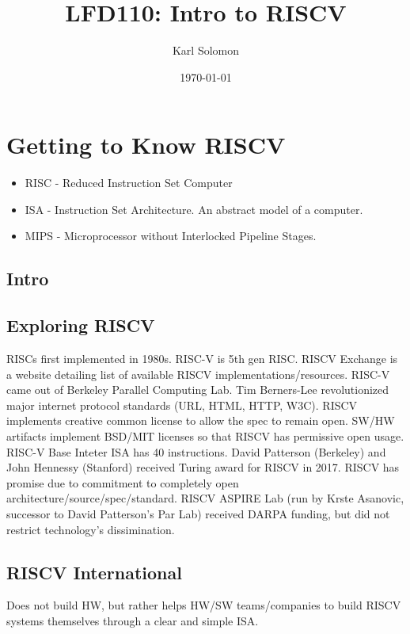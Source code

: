 \documentclass[10pt,a4paper]{article}
\title{LFD110: Intro to RISCV}
\author{Karl Solomon}
\date{\today}
\begin{document}
\vfuzz=10000pt
\hfuzz=10000pt


\maketitle
\tableofcontents
\newpage

\section{Getting to Know RISCV}
    \begin{itemize}
      \item RISC - Reduced Instruction Set Computer
      \item ISA - Instruction Set Architecture. An abstract model of a computer.
      \item MIPS - Microprocessor without Interlocked Pipeline Stages.
    \end{itemize}
    \subsection{Intro}
    \subsection{Exploring RISCV}
      RISCs first implemented in 1980s. RISC-V is 5th gen RISC. RISCV Exchange is a website detailing list of available RISCV implementations/resources.
      RISC-V came out of Berkeley Parallel Computing Lab.
      Tim Berners-Lee revolutionized major internet protocol standards (URL, HTML, HTTP, W3C).
      RISCV implements creative common license to allow the spec to remain open. SW/HW artifacts implement BSD/MIT licenses so that RISCV has permissive open usage.
      RISC-V Base Inteter ISA has 40 instructions.
      David Patterson (Berkeley) and John Hennessy (Stanford) received Turing award for RISCV in 2017.
      RISCV has promise due to commitment to completely open architecture/source/spec/standard.
      RISCV ASPIRE Lab (run by Krste Asanovic, successor to David Patterson's Par Lab) received DARPA funding, but did not restrict technology's dissimination.
    \subsection{RISCV International}
      Does not build HW, but rather helps HW/SW teams/companies to build RISCV systems themselves through a clear and simple ISA.
\end{document}
